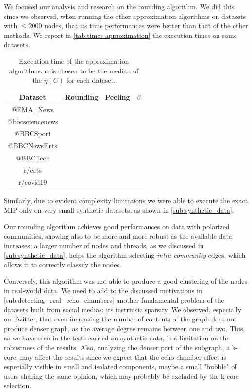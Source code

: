 We focused our analysis and research on the rounding algorithm. We did this
since we observed, when running the other approximation algorithms on datasets
with $\leq 2000$ nodes, that its time performances were better than that of the
other methods. We report in \autoref{tab:times-approximation} the execution
times on some datasets.

\begin{table}
	\centering
	\caption[Execution time of the approximation algorithms]{Execution time of
		the approximation algorithms. $\alpha$ is chosen to be the median of the
		$\eta(C)$ for each dataset.}
	\label{tab:times-approximation}
	\begin{tabular}{c|c|c|c}
		Dataset         & Rounding & Peeling & $\beta$ \\
		\hline
		@EMA\_News      &          &         &         \\
		@bbcsciencenews &          &         &         \\
		@BBCSport       &          &         &         \\
		@BBCNewsEnts    &          &         &         \\
		@BBCTech        &          &         &         \\
		r/cats          &          &         &         \\
		r/covid19       &          &         &         \\
	\end{tabular}
\end{table}

Similarly, due to evident complexity limitations we were able to execute the exact
\acrshort{MIP} only on very small synthetic datasets, as shown in
\autoref{sub:synthetic_data}.

\bigskip

Our rounding algorithm achieves good performances on data with
polarized communities, showing also to be more and more robust as the
available data increases: a larger number of nodes and threads, as we discussed
in \autoref{sub:synthetic_data}, helps the algorithm selecting
\emph{intra-community} edges, which allows it to correctly classify the nodes.

Conversely, this algorithm was not able to produce a good clustering of the
nodes in real-world data. We need to add to the discussed motivations in
\autoref{sub:detecting_real_echo_chambers} another fundamental problem of the
datasets built from social medias: its instrinsic sparsity. We observed,
especially on Twitter, that even increasing the number of contents of the graph
does not produce denser graph, as the average degree remains between one and
two. This, as we have seen in the tests carried on synthetic data, is a limitation
on the robustness of the results. Also, analyzing the denser part of the
subgraph, a k-core, may affect the results since we expect that the echo chamber
effect is especially visible in small and isolated components, maybe a small
"bubble" of users sharing the same opinion, which may probably be excluded by
the k-core selection.
